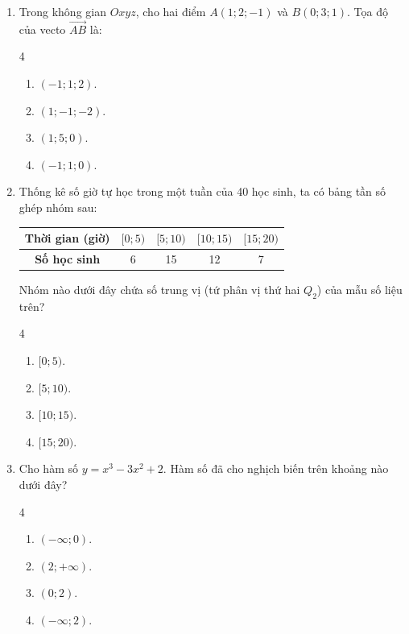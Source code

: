 \documentclass[12pt]{article}
\begin{document}
\begin{enumerate}[label=\textbf{Câu \arabic*.}, leftmargin=*]
		\item Trong không gian $Oxyz$, cho hai điểm $A(1; 2; -1)$ và $B(0; 3; 1)$. Tọa độ của vecto $\overrightarrow{AB}$ là:
		\begin{multicols}{4}
			\begin{enumerate}[label=\Alph*.]
				\item $(-1; 1; 2)$.
				\item $(1; -1; -2)$.
				\item $(1; 5; 0)$.
				\item $(-1; 1; 0)$.
			\end{enumerate}
		\end{multicols}
		
		\item Thống kê số giờ tự học trong một tuần của 40 học sinh, ta có bảng tần số ghép nhóm sau:
		\begin{center}
			\begin{tabular}{|c|c|c|c|c|}
				\hline
				\textbf{Thời gian (giờ)} & $[0; 5)$ & $[5; 10)$ & $[10; 15)$ & $[15; 20)$ \\
				\hline
				\textbf{Số học sinh} & 6 & 15 & 12 & 7 \\
				\hline
			\end{tabular}
		\end{center}
		Nhóm nào dưới đây chứa số trung vị (tứ phân vị thứ hai $Q_2$) của mẫu số liệu trên?
		\begin{multicols}{4}
			\begin{enumerate}[label=\Alph*.]
				\item $[0; 5)$.
				\item $[5; 10)$.
				\item $[10; 15)$.
				\item $[15; 20)$.
			\end{enumerate}
		\end{multicols}
		
		\item Cho hàm số $y = x^3 - 3x^2 + 2$. Hàm số đã cho nghịch biến trên khoảng nào dưới đây?
		\begin{multicols}{4}
			\begin{enumerate}[label=\Alph*.]
				\item $(-\infty; 0)$.
				\item $(2; +\infty)$.
				\item $(0; 2)$.
				\item $(-\infty; 2)$.
			\end{enumerate}
		\end{multicols}
		

\end{enumerate}
\end{document}

